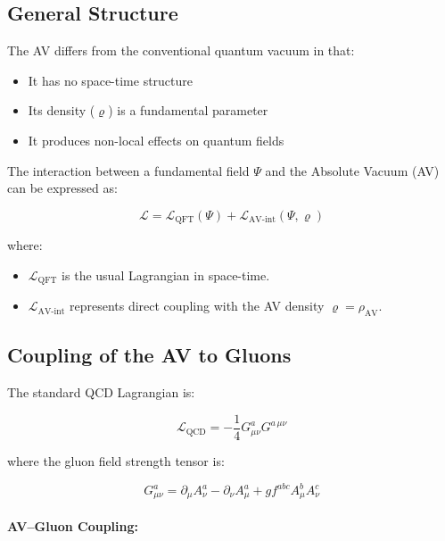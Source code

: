 \documentclass[twoside]{article}
\theoremstyle{definition}
\theoremstyle{remark}
\numberwithin{equation}{section}
\theoremstyle{definition}
\theoremstyle{example}
\theoremstyle{remark}
\numberwithin{equation}{section}%
\begin{document}
	\subsection{General Structure}
	
	The AV differs from the conventional quantum vacuum in that:
	\begin{itemize}
		\item It has no space-time structure \cite{rovelli2018}
		\item Its density (\(\varrho\)) is a fundamental parameter
		\item It produces non-local effects on quantum fields
	\end{itemize}       
	
	The interaction between a fundamental field \( \Psi \) and the Absolute Vacuum (AV) can be expressed as:
	
	\begin{equation}
		\mathcal{L} = \mathcal{L}_{\text{QFT}}(\Psi) + \mathcal{L}_{\text{AV-int}}(\Psi, \varrho)
	\end{equation}
	
	where:
	\begin{itemize}
		\item \( \mathcal{L}_{\text{QFT}} \) is the usual Lagrangian in space-time.
		\item \( \mathcal{L}_{\text{AV-int}} \) represents direct coupling with the AV density \( \varrho = \rho_{\text{AV}} \).
	\end{itemize}
	
		
	\subsection{Coupling of the AV to Gluons}
	
	The standard QCD Lagrangian is:
	
	\begin{equation}
		\mathcal{L}_{\text{QCD}} = -\frac{1}{4} G^a_{\mu\nu} G^{a\,\mu\nu}
	\end{equation}
	
	where the gluon field strength tensor is:
	
	\begin{equation}
		G^a_{\mu\nu} = \partial_\mu A^a_\nu - \partial_\nu A^a_\mu + g f^{abc} A^b_\mu A^c_\nu
	\end{equation}
	
	\paragraph{AV–Gluon Coupling:}
	
\end{document}
